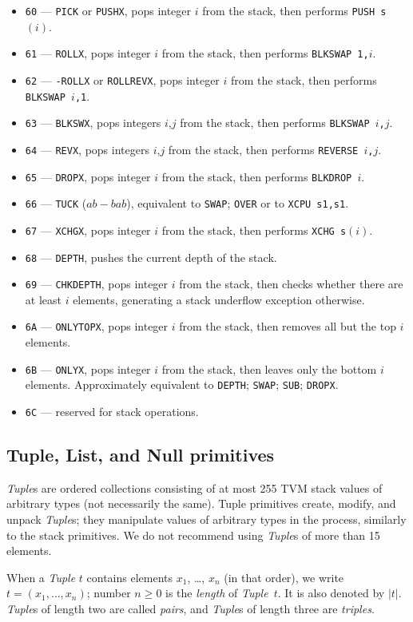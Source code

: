 \documentclass[12pt,oneside]{article}
\def\mysubsection#1{\subsection{#1}\fancyhead[C]{\small{\textsc{\textrm{\thesubsection.} #1}}}}
\begin{document}
\begin{itemize}
\item {\tt 60} --- {\tt PICK} or {\tt PUSHX}, pops integer $i$ from the stack, then performs {\tt PUSH s$(i)$}.
\item {\tt 61} --- {\tt ROLLX}, pops integer $i$ from the stack, then performs {\tt BLKSWAP 1,$i$}.
\item {\tt 62} --- {\tt -ROLLX} or {\tt ROLLREVX}, pops integer $i$ from the stack, then performs {\tt BLKSWAP $i$,1}.
\item {\tt 63} --- {\tt BLKSWX}, pops integers $i$,$j$ from the stack, then performs {\tt BLKSWAP $i$,$j$}.
\item {\tt 64} --- {\tt REVX}, pops integers $i$,$j$ from the stack, then performs {\tt REVERSE $i$,$j$}.
\item {\tt 65} --- {\tt DROPX}, pops integer $i$ from the stack, then performs {\tt BLKDROP $i$}.
\item {\tt 66} --- {\tt TUCK} ($a b - b a b$), equivalent to {\tt SWAP}; {\tt OVER} or to {\tt XCPU s1,s1}.
\item {\tt 67} --- {\tt XCHGX}, pops integer $i$ from the stack, then performs {\tt XCHG s$(i)$}.
\item {\tt 68} --- {\tt DEPTH}, pushes the current depth of the stack.
\item {\tt 69} --- {\tt CHKDEPTH}, pops integer $i$ from the stack, then checks whether there are at least $i$ elements, generating a stack underflow exception otherwise.
\item {\tt 6A} --- {\tt ONLYTOPX}, pops integer $i$ from the stack, then removes all but the top $i$ elements.
\item {\tt 6B} --- {\tt ONLYX}, pops integer $i$ from the stack, then leaves only the bottom $i$ elements. Approximately equivalent to {\tt DEPTH}; {\tt SWAP}; {\tt SUB}; {\tt DROPX}.
\item {\tt 6C} --- reserved for stack operations.
\end{itemize}

\mysubsection{Tuple, List, and Null primitives}

{\em Tuple\/}s are ordered collections consisting of at most 255 TVM stack values of arbitrary types (not necessarily the same). Tuple primitives create, modify, and unpack {\em Tuple\/}s; they manipulate values of arbitrary types in the process, similarly to the stack primitives. We do not recommend using {\em Tuple\/}s of more than 15 elements.

When a {\em Tuple\/} $t$ contains elements $x_1$, \ldots, $x_n$ (in that order), we write $t=(x_1,\ldots,x_n)$; number $n\geq0$ is the {\em length\/} of {\em Tuple\/}~$t$. It is also denoted by $|t|$. {\em Tuple\/}s of length two are called {\em pairs}, and {\em Tuple\/}s of length three are {\em triples}.
\end{document}
